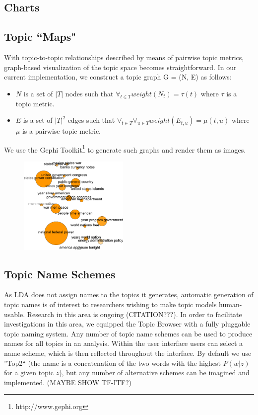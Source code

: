 \documentclass[a4paper,10pt]{article}
\begin{document}
\subsection{Charts}

\subsection{Topic ``Maps"}
With topic-to-topic relationships described by means of pairwise topic metrics,
graph-based visualization of the topic space becomes straightforward. In our
current implementation, we construct a topic graph G = (N, E) as follows:
\begin{itemize}
\item $N$ is a set of $|T|$ nodes such that $\forall_{t\in T} weight(N_{t}) =
\tau(t)$ where $\tau$ is a topic metric.
\item $E$ is a set of $|T|^2$ edges such that $\forall_{t\in T}\forall_{u\in T}
weight(E_{t,u}) = \mu(t,u)$ where $\mu$ is a pairwise topic metric.
\end{itemize}

We use the Gephi Toolkit\footnote{http://www.gephi.org} to generate such graphs
and render them as images.
\begin{figure}
\begin{center}
 \includegraphics[width=200px,keepaspectratio=true]{./topic_map_example.png}
\caption{}
\end{center}
\end{figure} 

\subsection{Topic Name Schemes}
As LDA does not assign names to the topics it generates, automatic generation of
topic names is of interest to researchers wishing to make topic models
human-usable. Research in this area is ongoing (CITATION???). In order to
facilitate investigations in this area, we equipped the Topic Browser with a
fully pluggable topic naming system. Any number of topic name schemes can be
used to produce names for all topics in an analysis. Within the user interface
users can select a name scheme, which is then reflected throughout the
interface. By default we use ''Top2`` (the name is a concatenation of the two
words with the highest $P(w|z)$ for a given topic $z$), but any number of
alternative schemes can be imagined and implemented. (MAYBE SHOW TF-ITF?)
\end{document}
